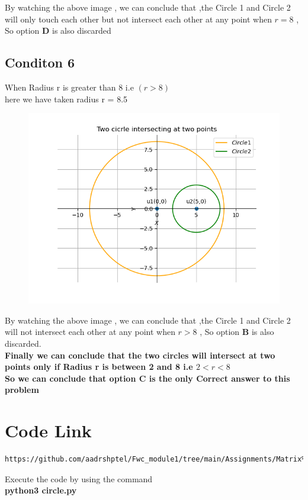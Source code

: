 \documentclass[journal,12pt,twocolumn]{IEEEtran}
\begin{document}
By watching the above image , we can conclude that ,the  Circle 1 and Circle 2 will only touch each other but not intersect each other at any point when $r=8$ , So  option \textbf{D} is also discarded

\subsection{Conditon 6} When Radius r is greater than 8 i.e $(r>8)$\\
here we have taken radius r = 8.5
\begin{figure}[h]
    \centering
\includegraphics[width=\columnwidth]{circle6.png}
    \label{fig:my_label}
\end{figure}

By watching the above image , we can conclude that ,the  Circle 1 and Circle 2  will not intersect each other at any point when $r>8$ , So  option \textbf{B} is also discarded.
\\
\textbf{Finally we can conclude that the two circles will intersect at two points only if Radius r is between 2 and 8 i.e $ 2<r<8 $}
\\
\textbf{So we can conclude that option C is the only Correct answer to this problem}
\section{\textbf{Code Link}}

\begin{lstlisting}
https://github.com/aadrshptel/Fwc_module1/tree/main/Assignments/Matrix%20assignments/Circles/codes
\end{lstlisting}
Execute the code by using the command\\
\textbf{python3 circle.py}
\end{document}
